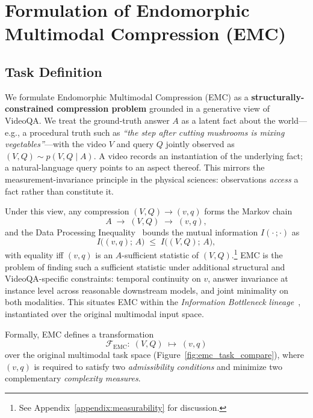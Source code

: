 \section{Formulation of Endomorphic Multimodal Compression (EMC)}

\subsection{Task Definition}
\label{emc_def}
We formulate Endomorphic Multimodal Compression (EMC) as a \textbf{structurally-constrained compression problem} grounded in a generative view of VideoQA. We treat the ground-truth answer $A$ as a latent fact about the world---e.g., a procedural truth such as \textit{``the step after cutting mushrooms is mixing vegetables''}---with the video $V$ and query $Q$ jointly observed as $(V, Q) \sim p(V, Q \mid A)$. A video records an instantiation of the underlying fact; a natural-language query points to an aspect thereof. This mirrors the measurement-invariance principle in the physical sciences: observations \textit{access} a fact rather than constitute it.

Under this view, any compression $(V, Q) \to (v, q)$ forms the Markov chain
\vspace{-0.2em}
\[
A \;\to\; (V, Q) \;\to\; (v, q),
\]
and the Data Processing Inequality~\citep{cover2006elements} bounds the mutual information $I(\cdot\,;\cdot)$ as
\vspace{-0.2em}
\[
I\big((v, q);\, A\big) \;\leq\; I\big((V, Q);\, A\big),
\]
with equality iff $(v, q)$ is an $A$-sufficient statistic of $(V, Q)$.\footnote{See Appendix~\ref{appendix:measurability} for discussion.} EMC is the problem of finding such a sufficient statistic under additional structural and VideoQA-specific constraints: temporal continuity on $v$, answer invariance at instance level across reasonable downstream models, and joint minimality on both modalities. This situates EMC within the \textit{Information Bottleneck lineage}~\citep{tishby1999information, tishby2015deep, alemi2017deep}, instantiated over the original multimodal input space.

Formally, EMC defines a transformation
\vspace{-0.2em}
\[
\mathcal{F}_{\text{EMC}}:\; (V, Q) \;\longmapsto\; (v, q)
\]
over the original multimodal task space (Figure~\ref{fig:emc_task_compare}), where $(v, q)$ is required to satisfy two \textit{admissibility conditions} and minimize two complementary \textit{complexity measures}.

